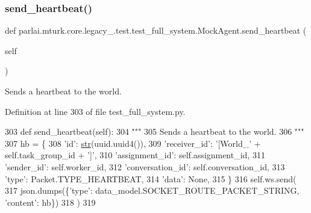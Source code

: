 \subsubsection{\texorpdfstring{send\+\_\+heartbeat()}{send\_heartbeat()}}
{\footnotesize\ttfamily def parlai.\+mturk.\+core.\+legacy\+\_.\+test.\+test\+\_\+full\+\_\+system.\+Mock\+Agent.\+send\+\_\+heartbeat (\begin{DoxyParamCaption}\item[{}]{self }\end{DoxyParamCaption})}

\begin{DoxyVerb}Sends a heartbeat to the world.
\end{DoxyVerb}
 

Definition at line 303 of file test\+\_\+full\+\_\+system.\+py.


\begin{DoxyCode}
303     \textcolor{keyword}{def }send\_heartbeat(self):
304         \textcolor{stringliteral}{"""}
305 \textcolor{stringliteral}{        Sends a heartbeat to the world.}
306 \textcolor{stringliteral}{        """}
307         hb = \{
308             \textcolor{stringliteral}{'id'}: \hyperlink{namespacegenerate__task__READMEs_a5b88452ffb87b78c8c85ececebafc09f}{str}(uuid.uuid4()),
309             \textcolor{stringliteral}{'receiver\_id'}: \textcolor{stringliteral}{'[World\_'} + self.task\_group\_id + \textcolor{stringliteral}{']'},
310             \textcolor{stringliteral}{'assignment\_id'}: self.assignment\_id,
311             \textcolor{stringliteral}{'sender\_id'}: self.worker\_id,
312             \textcolor{stringliteral}{'conversation\_id'}: self.conversation\_id,
313             \textcolor{stringliteral}{'type'}: Packet.TYPE\_HEARTBEAT,
314             \textcolor{stringliteral}{'data'}: \textcolor{keywordtype}{None},
315         \}
316         self.ws.send(
317             json.dumps(\{\textcolor{stringliteral}{'type'}: data\_model.SOCKET\_ROUTE\_PACKET\_STRING, \textcolor{stringliteral}{'content'}: hb\})
318         )
319 
\end{DoxyCode}
\mbox{\label{classparlai_1_1mturk_1_1core_1_1legacy__2018_1_1test_1_1test__full__system_1_1MockAgent_aceba268d9ab171f424784262542bbd0d}} 
